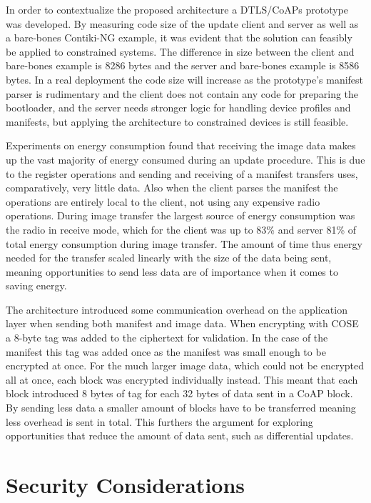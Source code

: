\documentclass[0-thesis.tex]{subfiles}
\begin{document}
In order to contextualize the proposed architecture a DTLS/CoAPs prototype was developed.
By measuring code size of the update client and server as well as a bare-bones Contiki-NG
example, it was evident that the solution can feasibly be applied to constrained systems.
The difference in size between the client and bare-bones example is 8286 bytes and the
server and bare-bones example is 8586 bytes. In a real deployment the code size will
increase as the prototype's manifest parser is rudimentary and the client does not contain
any code for preparing the bootloader, and the server needs stronger logic for handling
device profiles and manifests, but applying the architecture to constrained devices is
still feasible.

Experiments on energy consumption found that receiving the image data makes up the vast
majority of energy consumed during an update procedure. This is due to the register
operations and sending and receiving of a manifest transfers uses, comparatively, very
little data. Also when the client parses the manifest the operations are entirely local to
the client, not using any expensive radio operations. During image transfer the largest
source of energy consumption was the radio in receive mode, which for the client was up to
83\% and server 81\% of total energy consumption during image transfer. The amount of time
thus energy needed for the transfer scaled linearly with the size of the data being sent,
meaning opportunities to send less data are of importance when it comes to saving energy.

The architecture introduced some communication overhead on the application layer when
sending both manifest and image data. When encrypting with COSE a 8-byte tag was added to
the ciphertext for validation. In the case of the manifest this tag was added once as the
manifest was small enough to be encrypted at once. For the much larger image data, which
could not be encrypted all at once, each block was encrypted individually instead. This
meant that each block introduced 8 bytes of tag for each 32 bytes of data sent in a CoAP
block. By sending less data a smaller amount of blocks have to be transferred meaning less
overhead is sent in total. This furthers the argument for exploring opportunities that
reduce the amount of data sent, such as differential updates.

\section{Security Considerations}
\label{sec:security-considerations}
\end{document}
